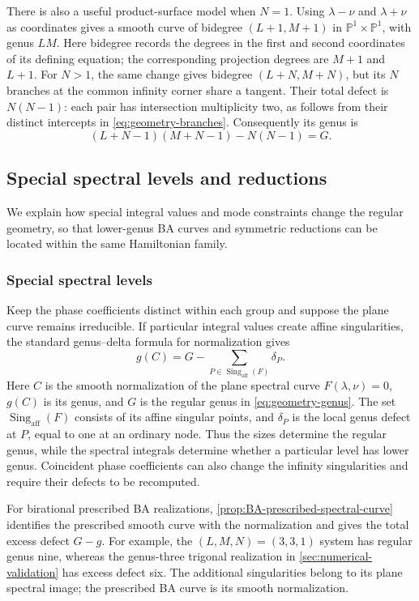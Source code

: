 There is also a useful product-surface model when $N=1$.
Using $\lambda-\nu$ and $\lambda+\nu$ as coordinates gives a
smooth curve of bidegree $(L+1,M+1)$ in
$\mathbb P^1\times\mathbb P^1$, with genus $LM$.
Here bidegree records the degrees in the first and second coordinates
of its defining equation; the corresponding projection degrees are
$M+1$ and $L+1$. For $N>1$, the same change gives bidegree
$(L+N,M+N)$, but its $N$ branches at the common infinity corner
share a tangent. Their total defect is $N(N-1)$: each pair has
intersection multiplicity two, as follows from their distinct
intercepts in \cref{eq:geometry-branches}. Consequently its genus is
\[
 (L+N-1)(M+N-1)-N(N-1)=G.
\]

\subsection{Special spectral levels and reductions}
\label{sec:special-spectral-levels}

We explain how special integral values and mode constraints change the
regular geometry, so that lower-genus BA curves and symmetric
reductions can be located within the same Hamiltonian family.

\subsubsection{Special spectral levels}

Keep the phase coefficients distinct within each group and suppose
the plane curve remains irreducible. If particular integral values
create affine singularities, the standard genus--delta formula for
normalization gives
\begin{equation}\label{eq:geometry-special-genus}
 g(C)=G-\sum_{P\in\operatorname{Sing}_{\mathrm{aff}}(F)}\delta_P.
\end{equation}
Here $C$ is the smooth normalization of the plane spectral curve
$F(\lambda,\nu)=0$, $g(C)$ is its genus, and $G$ is the regular genus
in \cref{eq:geometry-genus}. The set
$\operatorname{Sing}_{\mathrm{aff}}(F)$ consists of its affine singular
points, and $\delta_P$ is the local genus defect at $P$, equal to one
at an ordinary node.
Thus the sizes determine the regular genus, while the spectral
integrals determine whether a particular level has lower genus.
Coincident phase coefficients can also change the infinity
singularities and require their defects to be recomputed.

For birational prescribed BA realizations,
\cref{prop:BA-prescribed-spectral-curve} identifies the prescribed smooth
curve with the normalization and gives the total excess defect $G-g$.
For example, the $(L,M,N)=(3,3,1)$ system has regular genus nine,
whereas the genus-three trigonal realization in
\cref{sec:numerical-validation} has excess defect six. The additional
singularities belong to its plane spectral image; the prescribed BA
curve is its smooth normalization.

